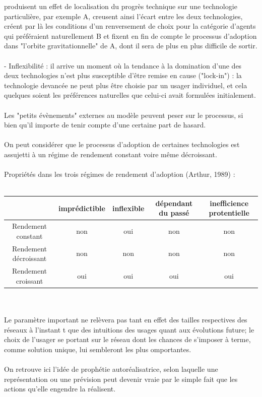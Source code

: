 \documentclass[a4paper, 10pt]{article}
\begin{document}
produisent un effet de localisation du progrès technique sur une technologie particulière, par exemple A,
creusent ainsi l'écart entre les deux technologies,
créent par là les conditions d'un renversement de choix pour la catégorie d'agents qui préféraient naturellement B et
fixent en fin de compte le processus d'adoption dans "l'orbite gravitationnelle" de A, dont il sera de plus en plus difficile de sortir.\\ \\
- Inflexibilité : il arrive un moment où la tendance à la domination d'une des deux technologies
n'est plus susceptible d'être remise en cause ("lock-in") :
la technologie devancée ne peut plus être choisie par un usager individuel,
et cela quelques soient les préférences naturelles que celui-ci avait formulées initialement.\\ \\
Les "petits évènements" externes au modèle peuvent peser sur le processus,
si bien qu'il importe de tenir compte d'une certaine part de hasard.\\ \\
On peut considérer que le processus d'adoption de certaines technologies est assujetti à
un régime de rendement constant voire même décroissant.\\ \\
Propriétés dans les trois régimes de rendement d'adoption (Arthur, 1989) :\\ \\
\begin{tabular}{|c|c|c|c|c|}
\hline
& imprédictible & inflexible & dépendant du passé & inefficience protentielle \\
\hline
Rendement constant & non & oui & non & non\\
\hline
Rendement décroissant & non & non & non & non\\
\hline
Rendement croissant & oui & oui & oui & oui\\
\hline
\end{tabular}\\ \\
Le paramètre important ne relèvera pas tant en effet des tailles respectives des réseaux à l'instant t
que des intuitions des usages quant aux évolutions future;
le choix de l'usager se portant sur le réseau dont les chances de s'imposer à terme,
comme solution unique, lui sembleront les plus omportantes.\\ \\
On retrouve ici l'idée de prophétie autoréalisatrice,
selon laquelle une représentation ou une prévision peut devenir vraie par le simple fait que les actions qu'elle engendre la réalisent.\\ \\
\end{document}
